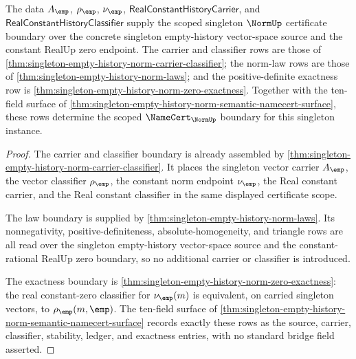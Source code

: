 \begin{corollary}
\label{cor:singleton-empty-history-norm-scoped-certificate-boundary}
The data $A_{\emp}$, $\rho_{\emp}$, $\nu_{\emp}$,
$\mathsf{RealConstantHistoryCarrier}$, and
$\mathsf{RealConstantHistoryClassifier}$ supply the scoped singleton $\NormUp$
certificate boundary over the concrete singleton empty-history vector-space
source and the constant RealUp zero endpoint. The carrier and classifier rows
are those of \autoref{thm:singleton-empty-history-norm-carrier-classifier}; the
norm-law rows are those of
\autoref{thm:singleton-empty-history-norm-laws}; and the positive-definite
exactness row is
\autoref{thm:singleton-empty-history-norm-zero-exactness}. Together with the
ten-field surface of
\autoref{thm:singleton-empty-history-norm-semantic-namecert-surface}, these rows
determine the scoped $\NameCert_{\NormUp}$ boundary for this singleton
instance.
\end{corollary}
\begin{proof}
The carrier and classifier boundary is already assembled by
\autoref{thm:singleton-empty-history-norm-carrier-classifier}. It places the
singleton vector carrier $A_{\emp}$, the vector classifier $\rho_{\emp}$, the
constant norm endpoint $\nu_{\emp}$, the Real constant carrier, and the Real
constant classifier in the same displayed certificate scope.

The law boundary is supplied by
\autoref{thm:singleton-empty-history-norm-laws}. Its nonnegativity,
positive-definiteness, absolute-homogeneity, and triangle rows are all read over
the singleton empty-history vector-space source and the constant-rational
RealUp zero boundary, so no additional carrier or classifier is introduced.

The exactness boundary is
\autoref{thm:singleton-empty-history-norm-zero-exactness}: the real
constant-zero classifier for $\nu_{\emp}(m)$ is equivalent, on carried singleton
vectors, to $\rho_{\emp}(m,\emp)$. The ten-field surface of
\autoref{thm:singleton-empty-history-norm-semantic-namecert-surface} records
exactly these rows as the source, carrier, classifier, stability, ledger, and
exactness entries, with no standard bridge field asserted.
\end{proof}

